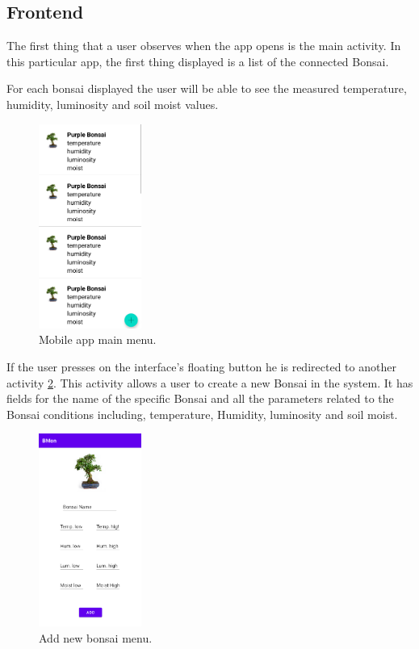 \documentclass{article}
\begin{document}
\subsection{Frontend}
The first thing that a user observes when the app opens is the main activity. In
this particular app, the first thing displayed is a list of the connected
Bonsai.

For each bonsai displayed the user will be able to see the measured temperature,
humidity, luminosity and soil moist values.

\begin{figure}[!ht]
    \centering
    \includegraphics[width=0.3\textwidth]{figures/MainMenu.png}
    \caption{Mobile app main menu.}
    \label{fig:MainMenu}
\end{figure}
If the user presses on the interface's floating button he is redirected to
another activity \ref{fig:AddBonsaiMenu}. This activity allows a user to create
a new Bonsai in the system. It has fields for the name of the specific Bonsai
and all the parameters related to the Bonsai conditions including, temperature,
Humidity, luminosity and soil moist.

\begin{figure}[!ht]
    \centering
    \includegraphics[width=0.3\textwidth]{figures/AddBonsai.png}
    \caption{Add new bonsai menu.}
    \label{fig:AddBonsaiMenu}
\end{figure}
\end{document}

